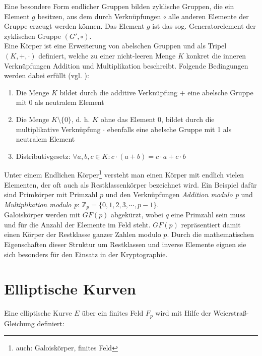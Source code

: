 Eine besondere Form endlicher Gruppen bilden zyklische Gruppen, die ein Element $g$ besitzen, aus dem durch Verknüpfungen $\circ$ alle anderen Elemente der Gruppe erzeugt werden können. Das Element $g$ ist das sog. Generatorelement der zyklischen Gruppe $(G',\circ)$. \\ 

Eine Körper ist eine Erweiterung von abelschen Gruppen und als Tripel $(K,+,\cdot)$ definiert, welche zu einer nicht-leeren Menge $K$ konkret die inneren Verknüpfungen Addition und Multiplikation beschreibt. Folgende Bedingungen werden dabei erfüllt (vgl. \cite{pullmann}):

\begin{enumerate}
  \item Die Menge $K$ bildet durch die additive Verknüpfung $+$ eine abelsche Gruppe
mit 0 als neutralem Element
  \item Die Menge $K\setminus\{0\}$, d. h. $K$ ohne das Element 0, bildet durch die multiplikative Verknüpfung $\cdot$ ebenfalls eine abelsche Gruppe mit 1 als neutralem Element
  \item Distributivgesetz: $ \forall a,b,c \in K: c \cdot (a + b) = c \cdot a + c \cdot b $
\end{enumerate}

Unter einem Endlichen Körper\footnote{auch: Galoiskörper, finites Feld} versteht man einen Körper mit endlich vielen Elementen, der oft auch als Restklassenkörper bezeichnet wird. Ein Beispiel dafür sind Primkörper mit Primzahl $p$ und den Verknüpfungen \textit{Addition modulo p} und \textit{Multiplikation modulo p}: $\mathbb{Z}_p = \{0,1,2,3,\cdots,p-1\}$. \\

Galoiskörper werden mit $GF(p)$ abgekürzt, wobei $q$ eine Primzahl sein muss und für die Anzahl der Elemente im Feld steht. $GF(p)$ repräsentiert damit einen Körper der Restklasse ganzer Zahlen modulo $p$. Durch die mathematischen Eigenschaften dieser Struktur um Restklassen und inverse Elemente eignen sie sich besonders für den Einsatz in der Kryptographie. \\


\section{Elliptische Kurven}

Eine elliptische Kurve $E$ über ein finites Feld $F_p$ wird mit Hilfe der Weierstraß-Gleichung definiert:

